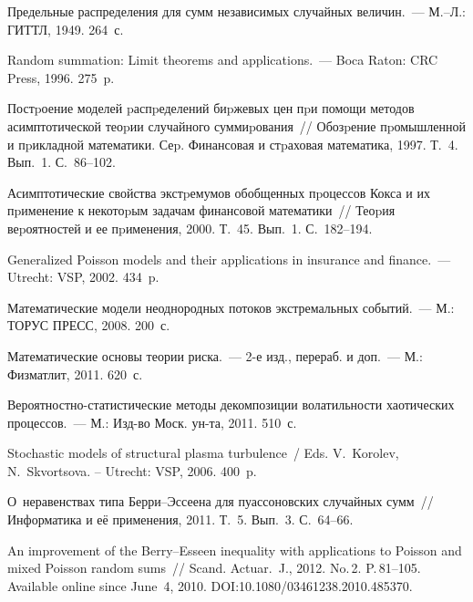 \begin{multicols}{2}
{{\begin{thebibliography}{99}
 Предельные распределения для
сумм независимых случайных величин.~--- М.--Л.: ГИТТЛ, 1949. 264~с.

 Random summation: Limit
theorems and applications.~--- Boca Raton: CRC Press, 1996. 275~p.

 Постpоение моделей pаспpеделений биpжевых цен
пpи помощи методов асимптотической теоpии случайного суммиpования~// 
Обозpение пpомышленной и пpикладной математики. Сеp.
Финансовая и стpаховая математика, 1997. Т.~4. Вып.~1. С.~86--102.

 Асимптотические свойства экстpемумов обобщенных
пpоцессов Кокса и их пpименение к некотоpым задачам финансовой
математики~// Теоpия веpоятностей и ее пpименения, 2000. Т.~45.
Вып.~1. С.~182--194.

 Generalized Poisson models and their
applications in insurance and finance.~--- Utrecht: VSP, 2002. 434~p.

 Математические модели
неоднородных потоков экстремальных событий.~--- М.: ТОРУС ПРЕСС,
2008. 200~с.

 Математические
основы теории риска.~--- 2-е изд., перераб. и доп.~--- М.: Физматлит,
2011. 620~с.

 Ве\-ро\-ят\-ност\-но-ста\-ти\-сти\-че\-ские методы декомпозиции
волатильности хаотических процессов.~--- М.: Изд-во Моск.
ун-та, 2011. 510~с.

Stochastic models of
structural plasma turbulence~/
Eds. V.~Korolev, N.~Skvortsova. -- Utrecht: VSP, 2006. 400~p.

\columnbreak

 О~неравенствах типа
Бер\-ри--Эс\-се\-ена для пуассоновских случайных сумм~// Информатика и её
применения, 2011. Т.~5. Вып.~3. С.~64--66.

 An improvement of the Berry--Esseen
inequality with applications to Poisson and mixed Poisson random
sums~// Scand. Actuar.~J., 2012. No.\,2. P.\,81--105.
Available online since June~4, 2010.
{\sf DOI:10.1080/03461238.2010.485370}.
\end{thebibliography} } }

\end{multicols}

